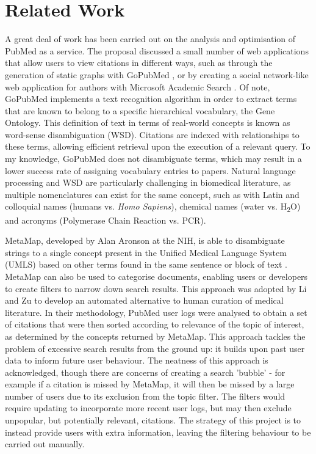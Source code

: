 \documentclass[Report.tex]{subfiles}
\begin{document}
\section{Related Work}
A great deal of work has been carried out on the analysis and optimisation of PubMed as a service. The proposal discussed a small number of web applications that allow users to view citations in different ways, such as through the generation of static graphs with GoPubMed \cite{gopubmed}, or by creating a social network-like web application for authors with Microsoft Academic Search \cite{mas}. Of note, GoPubMed implements a text recognition algorithm in order to extract terms that are known to belong to a specific hierarchical vocabulary, the Gene Ontology. This definition of text in terms of real-world concepts is known as word-sense disambiguation (WSD). Citations are indexed with relationships to these terms, allowing efficient retrieval upon the execution of a relevant query. To my knowledge, GoPubMed does not disambiguate terms, which may result in a lower success rate of assigning vocabulary entries to papers. Natural language processing and WSD are particularly challenging in biomedical literature, as multiple nomenclatures can exist for the same concept, such as with Latin and colloquial names (humans vs. \emph{Homo Sapiens}), chemical names (water vs. H{\textsubscript{2}}O) and acronyms (Polymerase Chain Reaction vs. PCR).\newline

\noindent MetaMap, developed by Alan Aronson at the NIH, is able to disambiguate strings to a single concept present in the Unified Medical Language System (UMLS) based on other terms found in the same sentence or block of text \cite{metamap2000}. MetaMap can also be used to categorise documents, enabling users or developers to create filters to narrow down search results. This approach was adopted by Li and Zu \cite{lizu} to develop an automated alternative to human curation of medical literature. In their methodology, PubMed user logs were analysed to obtain a set of citations that were then sorted according to relevance of the topic of interest, as determined by the concepts returned by MetaMap. This approach tackles the problem of excessive search results from the ground up: it builds upon past user data to inform future user behaviour. The neatness of this approach is acknowledged, though there are concerns of creating a search 'bubble' - for example if a citation is missed by MetaMap, it will then be missed by a large number of users due to its exclusion from the topic filter. The filters would require updating to incorporate more recent user logs, but may then exclude unpopular, but potentially relevant, citations. The strategy of this project is to instead provide users with extra information, leaving the filtering behaviour to be carried out manually. 
\end{document}
